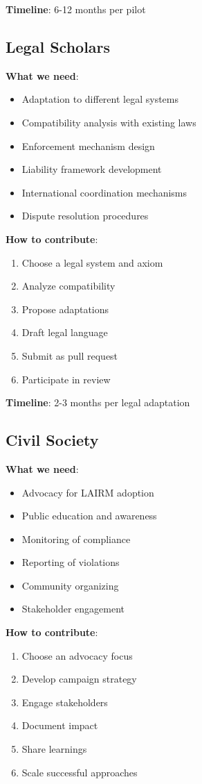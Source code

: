\documentclass[12pt,a4paper,twoside,openright]{book}
\begin{document}
\textbf{Timeline}: 6-12 months per pilot

\subsection{Legal Scholars}

\textbf{What we need}:
\begin{itemize}
    \item Adaptation to different legal systems
    \item Compatibility analysis with existing laws
    \item Enforcement mechanism design
    \item Liability framework development
    \item International coordination mechanisms
    \item Dispute resolution procedures
\end{itemize}

\textbf{How to contribute}:
\begin{enumerate}
    \item Choose a legal system and axiom
    \item Analyze compatibility
    \item Propose adaptations
    \item Draft legal language
    \item Submit as pull request
    \item Participate in review
\end{enumerate}

\textbf{Timeline}: 2-3 months per legal adaptation

\subsection{Civil Society}

\textbf{What we need}:
\begin{itemize}
    \item Advocacy for LAIRM adoption
    \item Public education and awareness
    \item Monitoring of compliance
    \item Reporting of violations
    \item Community organizing
    \item Stakeholder engagement
\end{itemize}

\textbf{How to contribute}:
\begin{enumerate}
    \item Choose an advocacy focus
    \item Develop campaign strategy
    \item Engage stakeholders
    \item Document impact
    \item Share learnings
    \item Scale successful approaches
\end{enumerate}
\end{document}
